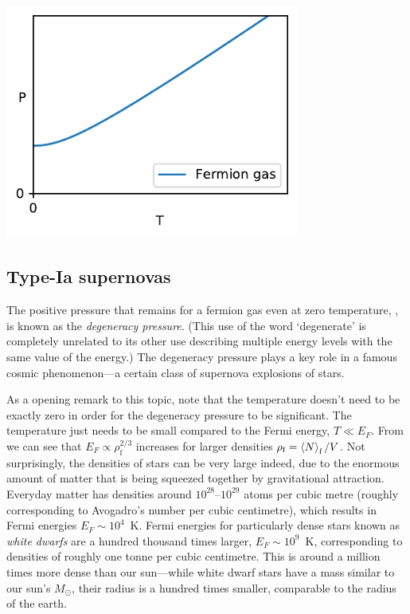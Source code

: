 \begin{center}\includegraphics[width=0.725\textwidth]{figs/week09_pressure.pdf}\end{center}



\subsection{Type-Ia supernovas}
The positive pressure that remains for a fermion gas even at zero temperature, , is known as the \textit{degeneracy pressure}.
(This use of the word `degenerate' is completely unrelated to its other use describing multiple energy levels with the same value of the energy.)
The degeneracy pressure plays a key role in a famous cosmic phenomenon---a certain class of supernova explosions of stars.

As a opening remark to this topic, note that the temperature doesn't need to be exactly zero in order for the degeneracy pressure to be significant.
The temperature just needs to be small compared to the Fermi energy, $T \ll E_F$.
From  we can see that $E_F \propto \rho_{\text{f}}^{2 / 3}$ increases for larger densities $\rho_{\text{f}} = \left\langle N \right\rangle_{\text{f}} / V$.
Not surprisingly, the densities of stars can be very large indeed, due to the enormous amount of matter that is being squeezed together by gravitational attraction.
Everyday matter has densities around $10^{28}$--$10^{29}$ atoms per cubic metre (roughly corresponding to Avogadro's number per cubic centimetre), which results in Fermi energies $E_F \sim 10^4$~K. %
Fermi energies for particularly dense stars known as \textit{white dwarfs} are a hundred thousand times larger, $E_F \sim 10^9$~K, corresponding to densities of roughly one tonne per cubic centimetre.
This is around a million times more dense than our sun---while white dwarf stars have a mass similar to our sun's $M_{\odot}$, their radius is a hundred times smaller, comparable to the radius of the earth.


